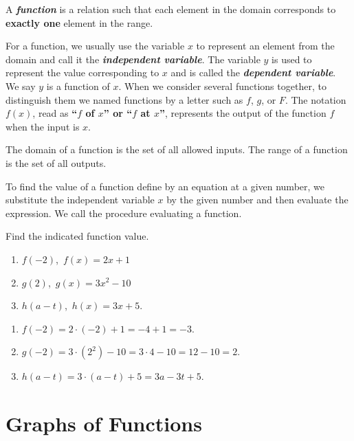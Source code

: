 \documentclass[en,12pt]{elegantbook}
\providecommand{\tightlist}{%
  \setlength{\itemsep}{0pt}\setlength{\parskip}{0pt}}
\providecommand{\tightlist}{%
  \setlength{\itemsep}{0pt}\setlength{\parskip}{0pt}}
\let\BeginKnitrBlock\begin \let\EndKnitrBlock\end
\begin{document}
A \textbf{\emph{function}} is a relation such that each element in the domain corresponds to \textbf{exactly one} element in the range.

For a function, we usually use the variable \(x\) to represent an element from the domain and call it the \textbf{\emph{independent variable}}. The variable \(y\) is used to represent the value corresponding to \(x\) and is called the \textbf{\emph{dependent variable}}. We say \(y\) is a function of \(x\). When we consider several functions together, to distinguish them we named functions by a letter such as \(f\), \(g\), or \(F\). The notation \(f(x)\), read as \textbf{``\(f\) of \(x\)'' or ``\(f\) at \(x\)''}, represents the output of the function \(f\) when the input is \(x\).

The domain of a function is the set of all allowed inputs. The range of a function is the set of all outputs.

To find the value of a function define by an equation at a given number, we substitute the independent variable \(x\) by the given number and then evaluate the expression. We call the procedure evaluating a function.

\BeginKnitrBlock{example}
\protect\hypertarget{exm:unnamed-chunk-219}{}{\label{exm:unnamed-chunk-219} }
Find the indicated function value.

\begin{enumerate}
\def\labelenumi{\arabic{enumi}.}
\tightlist
\item
  \(f(-2)\),~\(f(x)=2x+1\)
\item
  \(g(2)\),~\(g(x)=3x^2-10\)
\item
  \(h(a-t)\),~\(h(x)=3x+5\).
\end{enumerate}
\EndKnitrBlock{example}

\BeginKnitrBlock{solution}


\begin{enumerate}
\def\labelenumi{\arabic{enumi}.}
\tightlist
\item
  \(f(-2)=2\cdot(-2)+1=-4+1=-3\).
\item
  \(g(-2)=3\cdot(2^2)-10=3\cdot 4-10=12-10=2\).
\item
  \(h(a-t)=3\cdot(a-t)+5=3a-3t+5\).
\end{enumerate}
\EndKnitrBlock{solution}

\hypertarget{graphs-of-functions}{%
\section{Graphs of Functions}\label{graphs-of-functions}}
\end{document}
